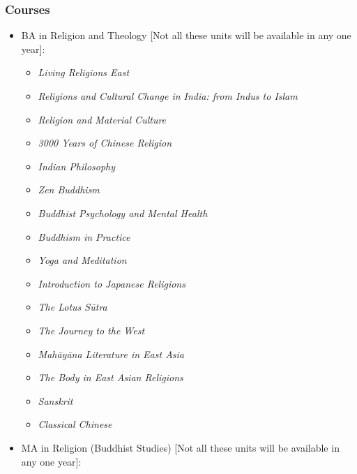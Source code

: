 \documentclass[11pt]{article}
\begin{document}
\subsubsection*{Courses}
\label{sec:orgd26b62a}
\begin{itemize}
\item BA in Religion and Theology [Not all these units will be available in any one year]:
\label{sec:org6f7a630}
\begin{itemize}
\item \emph{Living Religions East}\\
\item \emph{Religions and Cultural Change in India: from Indus to Islam}\\
\item \emph{Religion and Material Culture}\\
\item \emph{3000 Years of Chinese Religion}\\
\item \emph{Indian Philosophy}\\
\item \emph{Zen Buddhism}\\
\item \emph{Buddhist Psychology and Mental Health}\\
\item \emph{Buddhism in Practice}\\
\item \emph{Yoga and Meditation}\\
\item \emph{Introduction to Japanese Religions}\\
\item \emph{The Lotus Sūtra}\\
\item \emph{The Journey to the West}\\
\item \emph{Mahāyāna Literature in East Asia}\\
\item \emph{The Body in East Asian Religions}\\
\item \emph{Sanskrit}\\
\item \emph{Classical Chinese}\\
\end{itemize}
\item MA in Religion (Buddhist Studies) [Not all these units will be available in any one year]:

\end{itemize}
\end{document}
